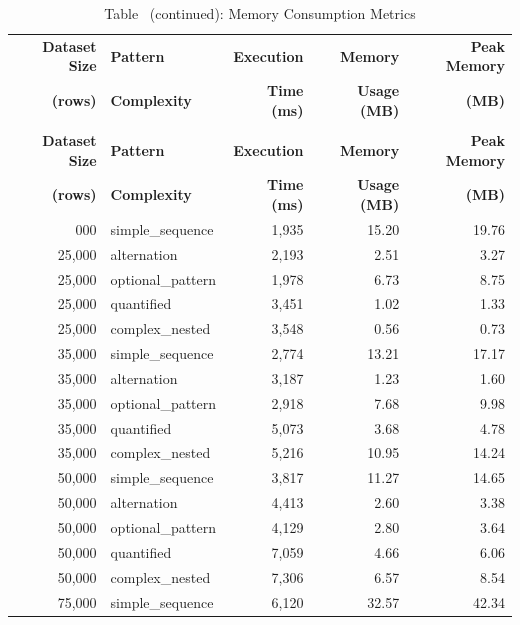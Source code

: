 {\small
\setlength{\LTleft}{0pt}
\setlength{\LTright}{0pt}
\begin{longtable}{@{\extracolsep{\fill}}rlrrr}
\caption{Memory Consumption Metrics}
\label{tab:memory_cache} \\
\toprule
\textbf{Dataset Size} & \textbf{Pattern} & \textbf{Execution} & \textbf{Memory} & \textbf{Peak Memory} \\
\textbf{(rows)} & \textbf{Complexity} & \textbf{Time (ms)} & \textbf{Usage (MB)} & \textbf{(MB)} \\
\midrule
\endfirsthead
\caption*{Table~\thetable{} (continued): Memory Consumption Metrics} \\
\toprule
\textbf{Dataset Size} & \textbf{Pattern} & \textbf{Execution} & \textbf{Memory} & \textbf{Peak Memory} \\
\textbf{(rows)} & \textbf{Complexity} & \textbf{Time (ms)} & \textbf{Usage (MB)} & \textbf{(MB)} \\
\midrule
\endhead
\bottomrule
\endfoot
 25{,}000 & simple\_sequence  & 1{,}935 & 15.20 & 19.76 \\
 25{,}000 & alternation       & 2{,}193 &  2.51 &  3.27 \\
 25{,}000 & optional\_pattern & 1{,}978 &  6.73 &  8.75 \\
 25{,}000 & quantified        & 3{,}451 &  1.02 &  1.33 \\
 25{,}000 & complex\_nested   & 3{,}548 &  0.56 &  0.73 \\
\midrule
 35{,}000 & simple\_sequence  & 2{,}774 & 13.21 & 17.17 \\
 35{,}000 & alternation       & 3{,}187 &  1.23 &  1.60 \\
 35{,}000 & optional\_pattern & 2{,}918 &  7.68 &  9.98 \\
 35{,}000 & quantified        & 5{,}073 &  3.68 &  4.78 \\
 35{,}000 & complex\_nested   & 5{,}216 & 10.95 & 14.24 \\
\midrule
 50{,}000 & simple\_sequence  & 3{,}817 & 11.27 & 14.65 \\
 50{,}000 & alternation       & 4{,}413 &  2.60 &  3.38 \\
 50{,}000 & optional\_pattern & 4{,}129 &  2.80 &  3.64 \\
 50{,}000 & quantified        & 7{,}059 &  4.66 &  6.06 \\
 50{,}000 & complex\_nested   & 7{,}306 &  6.57 &  8.54 \\
\midrule
 75{,}000 & simple\_sequence  & 6{,}120 & 32.57 & 42.34 \\

\end{longtable}}
